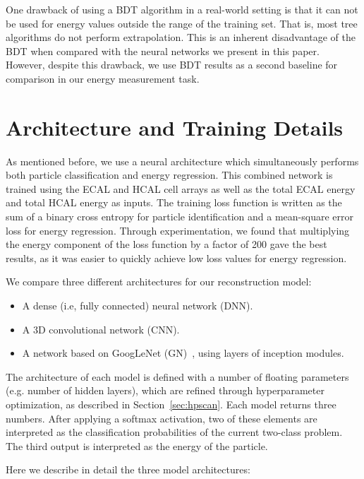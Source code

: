 One drawback of using a BDT algorithm in a real-world setting is that it can not be used for energy values outside the range of the training set. That is, most tree algorithms do not perform extrapolation. This is an inherent disadvantage of the BDT when compared with the neural networks we present in this paper. However, despite this drawback, we use BDT results as a second baseline for comparison in our energy measurement task.

\section{Architecture and Training Details}

As mentioned before, we use a neural architecture which simultaneously performs both particle classification and energy regression. This combined network is trained using the ECAL and HCAL cell arrays as well as the total ECAL energy and total HCAL energy as inputs. The training loss function is written as the sum of a binary cross entropy for particle identification and a mean-square error loss for energy regression. Through experimentation, we found that multiplying the energy component of the loss function by a factor of 200 gave the best results, as it was easier to quickly achieve low loss values for energy regression.

We compare three different architectures for our reconstruction model:

\begin{itemize}
\item A dense (i.e, fully connected) neural network (DNN).
\item A 3D convolutional network (CNN).
\item A network based on GoogLeNet (GN)~\cite{GoogLeNet}, using layers of inception modules.
\end{itemize}

The architecture of each model is defined with a number of floating parameters (e.g. number of hidden layers), which are refined through hyperparameter optimization, as described in Section~\ref{sec:hpscan}. Each model returns three numbers. After applying a softmax activation, two of these elements are interpreted as the classification probabilities of the current two-class problem. The third output is interpreted as the energy of the particle.

Here we describe in detail the three model architectures:

